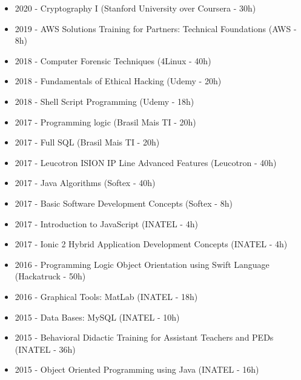 \documentclass[10pt,a4paper,ragged2e, normalphoto]{altacv}
\begin{document}
\begin{fullwidth}

\begin{itemize}
    \item 2020 - Cryptography I (Stanford University over Coursera - 30h)
    \item 2019 - AWS Solutions Training for Partners: Technical Foundations (AWS - 8h)
    \item 2018 - Computer Forensic Techniques (4Linux - 40h)
    \item 2018 - Fundamentals of Ethical Hacking (Udemy - 20h)
    \item 2018 - Shell Script Programming (Udemy - 18h)
    \item 2017 - Programming logic (Brasil Mais TI - 20h)
    \item 2017 - Full SQL (Brasil Mais TI - 20h)
    \item 2017 - Leucotron ISION IP Line Advanced Features (Leucotron - 40h)
    \item 2017 - Java Algorithms (Softex - 40h)
    \item 2017 - Basic Software Development Concepts (Softex - 8h)
    \item 2017 - Introduction to JavaScript (INATEL - 4h)
    \item 2017 - Ionic 2 Hybrid Application Development Concepts (INATEL - 4h)
    \item 2016 - Programming Logic Object Orientation using Swift Language (Hackatruck - 50h)
    \item 2016 - Graphical Tools: MatLab (INATEL - 18h)
    \item 2015 - Data Bases: MySQL (INATEL - 10h)
    \item 2015 - Behavioral Didactic Training for Assistant Teachers and PEDs (INATEL - 36h)
    \item 2015 - Object Oriented Programming using Java (INATEL - 16h)
\end{itemize}

\end{fullwidth}
\end{document}
